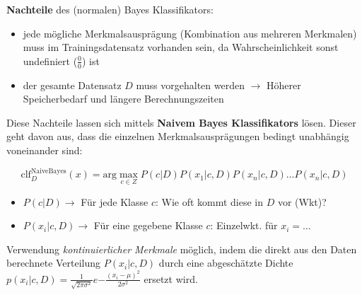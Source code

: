 \textbf{Nachteile} des (normalen) Bayes Klassifikators:
\begin{itemize}
    \item jede mögliche Merkmalsausprägung (Kombination aus mehreren Merkmalen) muss im Trainingsdatensatz vorhanden sein, da Wahrscheinlichkeit sonst undefiniert ($\frac{0}{0}$) ist
    \item der gesamte Datensatz $D$ muss vorgehalten werden $\rightarrow$ Höherer Speicherbedarf und längere Berechnungszeiten
\end{itemize}

Diese Nachteile lassen sich mittels \textbf{Naivem Bayes Klassifikators} lösen. Dieser geht davon aus, dass die einzelnen Merkmalsausprägungen bedingt unabhängig voneinander sind:

\begin{equation*}
    \text{clf}_D^{\text{NaiveBayes}}(x)=\text{arg}\max_{c\in Z} P(c\vert D)P(x_1\vert c, D)P(x_n\vert c, D)\dots P(x_n\vert c, D)
\end{equation*}

\begin{itemize}
    \item $P(c\vert D) \rightarrow$ Für jede Klasse $c$: Wie oft kommt diese in $D$ vor (Wkt)?
    \item $P(x_i\vert c, D) \rightarrow$ Für eine gegebene Klasse $c$: Einzelwkt. für $x_i=\dots$ 
\end{itemize}

Verwendung \emph{kontinuierlicher Merkmale} möglich, indem die direkt aus den Daten berechnete Verteilung $P(x_i\vert c,D)$ durch eine abgeschätzte Dichte $p(x_i\vert c,D)=\frac{1}{\sqrt{2\pi\sigma^2}}e{-\frac{(x_i-\mu)^2}{2\sigma^2}}$ ersetzt wird.